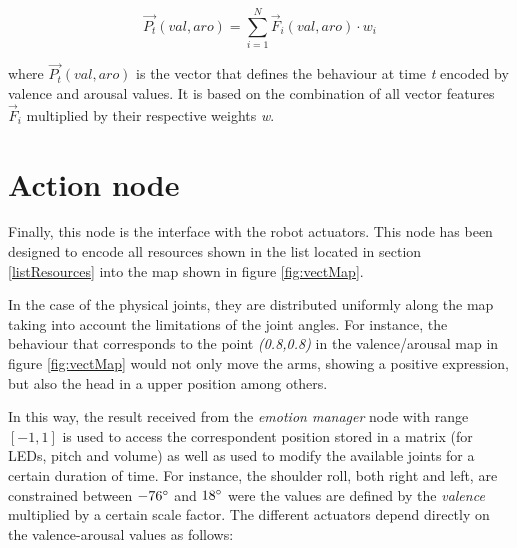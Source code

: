 \begin{equation}
 \vec{P_{t}}(val,aro) = \sum_{i=1}^N\vec{F}_{i}(val,aro) \cdot w_i
\end{equation}\label{eq:weight}

where $\vec{P_{t}}(val,aro)$ is the vector that defines the behaviour at time \textit{t} encoded by valence and arousal values. It is based on the combination of all vector features $ \vec{F}_{i} $ multiplied by their respective weights \textit{w}.

\section{Action node}
Finally, this node is the interface with the robot actuators. This node has been designed to encode all resources shown in the list located in section \ref{listResources} into the map shown in figure \ref{fig:vectMap}.

In the case of the physical joints, they are distributed uniformly along the map taking into account the limitations of the joint angles. For instance, the behaviour that corresponds to the point \textit{(0.8,0.8)} in the valence/arousal map in figure \ref{fig:vectMap} would not only move the arms, showing a positive expression, but also the head in a upper position among others.

In this way, the result received from the \textit{emotion manager} node with range $ [-1,1] $ is used to access the correspondent position stored in a matrix (for LEDs, pitch and volume) as well as used to modify the available joints for a certain duration of time. For instance, the shoulder roll, both right and left, are constrained between $ -76\degree $ and $ 18\degree $ were the values are defined by the \textit{valence} multiplied by a certain scale factor. The different actuators depend directly on the valence-arousal values as follows: 

